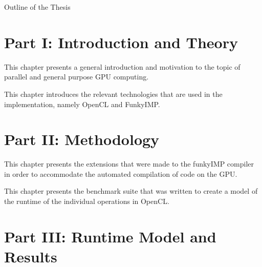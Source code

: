 \clearemptydoublepage

{}

\begin{center}
	\huge{Outline of the Thesis}
\end{center}




\section*{Part I: Introduction and Theory}

  \vspace{1mm}

\noindent  This chapter presents a general introduction and motivation to the topic of parallel and general purpose GPU computing.\\

  \vspace{1mm}

\noindent  This chapter introduces the relevant technologies that are used in the implementation, namely OpenCL and FunkyIMP.   \\

\section*{Part II: Methodology}

  \vspace{1mm}

\noindent  This chapter presents the extensions that were made to the funkyIMP compiler in order to accommodate the automated compilation of code on the GPU.   \\

  \vspace{1mm}

\noindent  This chapter presents the benchmark suite that was written to create a model of the runtime of the individual operations in OpenCL.   \\

\section*{Part III: Runtime Model and Results}

